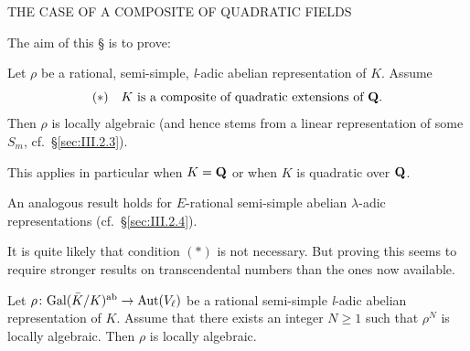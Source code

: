 
%
  {THE CASE OF A COMPOSITE OF QUADRATIC FIELDS}


The aim of this \S{} is to prove:

\begin{theorem}
Let $\rho$ be a rational, semi-simple, \textit{l}-adic abelian
representation of $K$.  Assume
\[
(*)\quad K\text{ is a composite of quadratic extensions of }\mathbf{Q}.
\]
Then $\rho$ is locally algebraic (and hence stems from a linear
representation of some $S_m$, cf.~\S\ref{sec:III.2.3}).
\end{theorem}

This applies in particular when $K=\mathbf{Q}$ or when $K$ is quadratic over
$\mathbf{Q}$.

\begin{remarks}
\begin{nlist}
\item An analogous result holds for $E$-rational semi-simple abelian
$\lambda$-adic representations (cf.~\S\ref{sec:III.2.4}).
\item It is quite likely that condition $(*)$ is not necessary.  But
proving this seems to require stronger results on transcendental
numbers than the ones now available.
\end{nlist}
\end{remarks}


\begin{proposition}
Let $\rho\colon \mathrm{Gal}(\bar K/K)^{\mathrm{ab}}\to\mathrm{Aut}(V_\ell)$ be a
rational semi-simple \textit{l}-adic abelian representation of $K$.
Assume that there exists an integer $N\geq 1$ such that $\rho^N$ is
locally algebraic.  Then $\rho$ is locally algebraic.
\end{proposition}

